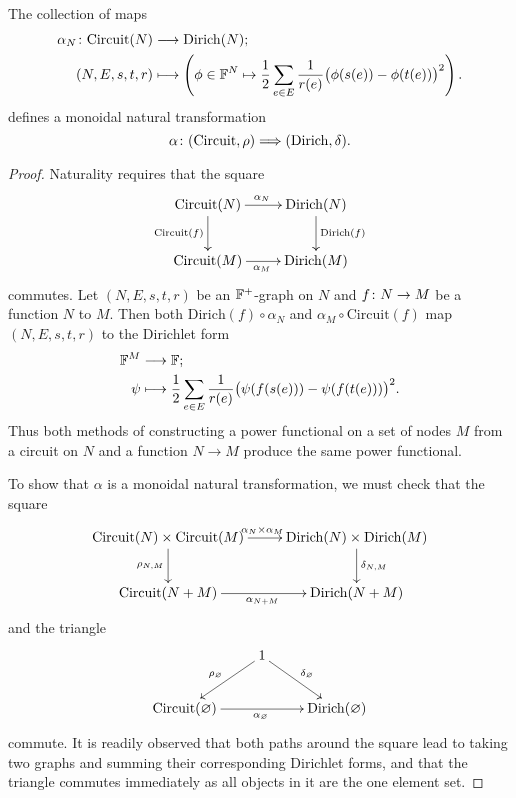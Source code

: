 \begin{proposition} 
  The collection of maps
\begin{align*}
  \alpha_N{\colon} \mathrm{Circuit}(N) &\longrightarrow \mathrm{Dirich}(N); \\
  (N,E,s,t,r) &\longmapsto \left(\phi \in {\mathbb F}^N \mapsto \frac{1}{2} \sum_{e \in E}
  \frac{1}{r(e)}\big(\phi(s(e))-\phi(t(e))\big)^2\right).
\end{align*}
defines a monoidal natural transformation
\[
  \alpha{\colon} (\mathrm{Circuit},\rho) \Longrightarrow
  (\mathrm{Dirich},\delta).
\]
\end{proposition}
\begin{proof}
Naturality requires that the square
\[
  \xymatrix{
    \mathrm{Circuit}(N) \ar[r]^{\alpha_N} \ar[d]_{\mathrm{Circuit}(f)} &
    \mathrm{Dirich}(N) \ar[d]^{\mathrm{Dirich}(f)}  \\
    \mathrm{Circuit}(M) \ar[r]_{\alpha_M} & \mathrm{Dirich}(M)
  }
\]
commutes. Let $(N,E,s,t,r)$ be an ${\mathbb F}^+$-graph on $N$ and $f{\colon} N \to M$ be a
function $N$ to $M$. Then both $\mathrm{Dirich}(f) \circ \alpha_N$ and $\alpha_M
\circ \mathrm{Circuit}(f)$ map $(N,E,s,t,r)$ to the Dirichlet form
\begin{align*}
  {\mathbb F}^M &\longrightarrow {\mathbb F};\\
  \psi &\longmapsto \frac{1}{2} \sum_{e \in E}\frac{1}{r(e)}
  \big(\psi(f(s(e)))-\psi(f(t(e)))\big)^2.
\end{align*}
Thus both methods of constructing a power functional on a set of nodes $M$ from
a circuit on $N$ and a function $N \to M$ produce the same power functional.

To show that $\alpha$ is a monoidal natural transformation, we must check that
the square
\[
\xymatrix{
  \mathrm{Circuit}(N) \times \mathrm{Circuit}(M) \ar[r]^{\alpha_N \times
  \alpha_M} \ar[d]_{\rho_{N,M}} & \mathrm{Dirich}(N) \times \mathrm{Dirich}(M)
  \ar[d]^{\delta_{N,M}}  \\
  \mathrm{Circuit}(N+M) \ar[r]_{\alpha_{N+M}} & \mathrm{Dirich}(N+M)
}
\]
and the triangle
\[
\xymatrix{
  & 1 \ar[dl]_{\rho_\varnothing} \ar[dr]^{\delta_\varnothing}\\
\mathrm{Circuit}(\varnothing)  \ar[rr]_{\alpha_\varnothing} &&
\mathrm{Dirich}(\varnothing)
}
\]
commute. It is readily observed that both paths around the square lead to taking
two graphs and summing their corresponding Dirichlet forms, and that the
triangle commutes immediately as all objects in it are the one element set.
\end{proof}

